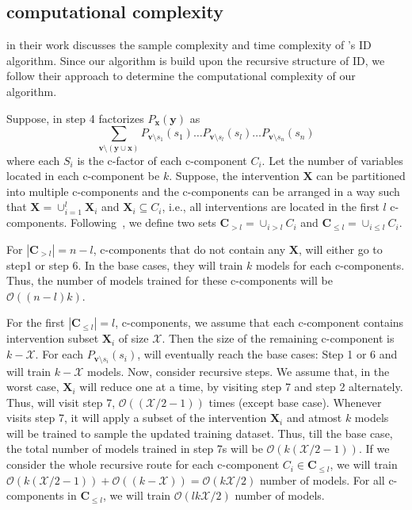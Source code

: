 \documentclass{article}
\newcommand{\x}{\mathbf{x}}
\newcommand{\y}{\mathbf{y}}
\newcommand{\X}{\mathbf{X}}
\newcommand{\Oc}{\mathcal{O}}
\newcommand{\Xc}{\mathcal{X}}
\newcommand{\vb}{\mathbf{v}}
\newcommand{\mbf}{\mathbf}
\newcommand{\idgen}{\text{ID-GEN}\xspace}
\theoremstyle{plain}
\theoremstyle{definition}
\theoremstyle{remark}
\begin{document}
\subsection{\idgen computational complexity}
\label{appex:complexity}

\citet{bhattacharyya2022efficient} in their work discusses the sample complexity and time complexity of \citet{shpitser2008complete}'s ID algorithm. Since our algorithm \idgen is build upon the recursive structure of ID, we follow their approach to determine the computational complexity of our algorithm.

Suppose, in step 4 \idgen factorizes $P_{\x}(\y)$ as $${\textstyle\sum}_{\vb\setminus(\y\cup \x)} 
P_{\vb\setminus s_1}(s_1)   \hdots
P_{\vb\setminus s_l}(s_l)  
\hdots
P_{\vb\setminus s_n}(s_n)$$
where each $S_i$ is the c-factor of each c-component $C_i$. Let the number of variables located in each c-component be $k$.
Suppose, the intervention $\X$ can be partitioned into multiple c-components and the c-components can be arranged in a way such that $\X= \cup^{l}_{i=1} \X_i$ and $\X_i \subseteq C_i$, i.e., all interventions are located in the first $l$ c-components. Following~\cite{bhattacharyya2022efficient}, we define two sets $\mbf{C}_{>l}= \cup_{i>l} C_i$ and $\mbf{C}_{\leq l}= \cup_{i\leq l} C_i$.

For $|\mbf{C}_{>l}|= n-l$, c-components that do not contain any $\X$, \idgen will either go to  step1 or step 6. In the base cases, they will train $k$ models for each c-components. Thus, the number of models trained for these c-components will be $\mathcal{O}((n-l)k)$. 


For the first $|\mbf{C}_{\leq l}|= l$, c-components, we assume that each c-component contains intervention subset $\X_i$ of size $\Xc$. Then the size of the remaining c-component is $k-\Xc$. For each $P_{\vb\setminus s_i}(s_i)$, \idgen will eventually reach the base cases: Step 1 or 6 and will train $k-\Xc$ models. 
Now, consider recursive steps. We assume that, in the worst case, $\X_i$ will reduce one at a time, by visiting step 7 and step 2 alternately. Thus, \idgen will visit step 7, $\Oc((\Xc/2-1))$ times (except base case).
Whenever \idgen visits step 7, it will apply a subset of the intervention $\X_i$ and atmost  $k$ models will be trained to sample the updated training dataset.
 Thus, till the base case, the total number of models trained in step 7s will be $\Oc(k(\Xc/2-1))$.
If we consider the whole recursive route for each c-component $C_i\in \mbf{C}_{\leq l}$,
 we will train $\Oc(k(\Xc/2-1)) + \Oc((k-\Xc)) = \Oc(k\Xc/2)$ number of models. For all c-components in $\mbf{C}_{\leq l}$, we will train $\Oc(lk\Xc/2)$ number of models.
\end{document}
